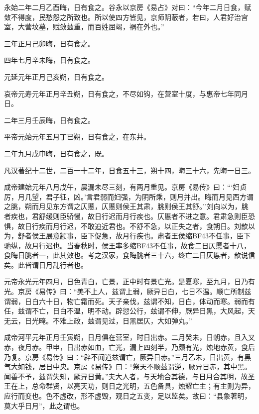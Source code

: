 \documentclass[]{article}
\begin{document}
永始二年二月乙酉晦，日有食之。谷永以京房《易占》对曰：``今年二月日食，赋敛不得度，民愁怨之所致也。所以使四方皆见，京师阴蔽者，若曰，人君好治宫室，大营坟墓，赋敛兹重，而百姓屈竭，祸在外也。''

三年正月己卯晦，日有食之。

四年七月辛未晦，日有食之。

元延元年正月己亥朔，日有食之。

哀帝元寿元年正月辛丑朔，日有食之，不尽如钩，在营室十度，与惠帝七年同月日。

二年三月壬辰晦，日有食之。

平帝元始元年五月丁已朔，日有食之，在东井。

二年九月戊申晦，日有食之，既。

凡汉著纪十二世，二百一十二年，日食五十三，朔十四，晦三十六，先晦一日三。

成帝建始元年八月戊午，晨漏未尽三刻，有两月重见。京房《易传》曰：```妇贞厉，月几望，君子征，凶。'言君弱而妇强，为阴所乘，则月并出。晦而月见西方谓之朓，朔而月见东方谓之仄慝，仄慝则侯王其肃，朓则侯王其舒。''刘向以为，朓者疾也，君舒缓则臣骄慢，故日行迟而月行疾也。仄慝者不进之意。君肃急则臣恐惧，故日行疾而月行迟，不敢迫近君也。不舒不急，以正失之者，食朔日。刘歆以为，舒者侯王展意颛事，臣下促急，故月行疾也。肃者王侯缩BF43不任事，臣下驰纵，故月行迟也。当春秋时，侯王率多缩BF43不任事，故食二日仄慝者十八，食晦日朓者一，此其效也。考之汉家，食晦朓者三十六，终亡二日仄慝者，歆说信矣。此皆谓日月乱行者也。

元帝永光元年四月，日色青白，亡景，正中时有景亡光。是夏寒，至九月，日乃有光。京房《易传》曰：``美不上人，兹谓上弱，厥异日白，七日不温。顺亡所制兹谓弱，日白六十日，物亡霜而死。天子亲伐，兹谓不知，日白，体动而寒。弱而有任，兹谓不亡，日白不温，明不动。辟愆公行，兹谓不伸，厥异日黑，大风起，天无云，日光晻。不难上政，兹谓见过，日黑居仄，大如弹丸。''

成帝河平元年正月壬寅朔，日月俱在营室，时日出赤。二月癸未，日朝赤，且入又赤，夜月赤。甲申，日出赤如血，亡光，漏上四刻半，乃颇有光，烛地赤黄，食后乃复。京房《易传》曰：``辟不闻道兹谓亡，厥异日赤。''三月乙未，日出黄，有黑气大如钱，居日中央。京房《易传》曰：``祭天不顺兹谓逆，厥异日赤，其中黑。闻善不予，兹谓失知，厥异日黄。''夫大人者，与天地合其德，与日月合其明，故圣王在上，总命群贤，以亮天功，则日之光明，五色备具，烛耀亡主；有主则为异，应行而变也。色不虚改，形不虚毁，观日之五变，足以监矣。故曰：``县象著明，莫大乎日月''，此之谓也。
\end{document}
